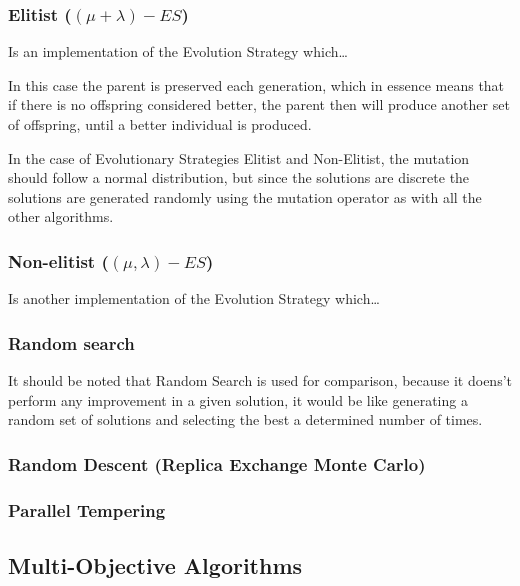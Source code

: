 \subsubsection{Elitist ($(\mu + \lambda) - ES$)}

Is an implementation of the Evolution Strategy which\dots

In this case the parent is preserved each generation, which in essence means that if there is no offspring considered better, the parent then will produce another set of offspring, until a better individual is produced.


In the case of Evolutionary Strategies Elitist and Non-Elitist, the mutation should follow a normal distribution, but since the solutions are discrete the solutions are generated randomly using the mutation operator as with all the other algorithms.

\subsubsection{Non-elitist ($(\mu, \lambda) - ES$)}

Is another implementation of the Evolution Strategy which\dots

\subsubsection{Random search} 

It should be noted that Random Search is used for comparison, because it doens't perform any improvement in a given solution, it would be like generating a random set of solutions and selecting the best a determined number of times.

\subsubsection{Random Descent (Replica Exchange Monte Carlo)} 
\subsubsection{Parallel Tempering} 

\subsection{Multi-Objective Algorithms}

